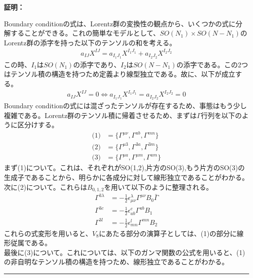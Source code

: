 \documentclass[dvipdfmx,a4paper,10.5pt]{article}
\numberwithin{equation}{section}
\newenvironment{proofbox}
{\begin{prooflabel}\textbf{証明：}\end{prooflabel}\vspace{0.8em}}
{\par\vspace{1em}\hrule\vspace{1em}}
\begin{document}
\begin{proofbox}
    Boundary conditionの式は、Lorentz群の変換性の観点から、いくつかの式に分解することができる。これの簡単なモデルとして、$SO(N_{1})\times SO(N-N_{1})$のLorentz群の添字を持った以下のテンソルの和を考える。
\begin{equation}\begin{split}
    a_{IJ}X^{IJ}=a_{I_{1}J_{1}}X^{I_{1}J_{1}}+a_{I_{2}J_{2}}X^{I_{2}J_{2}}
\end{split} \end{equation}
この時、$I_{1}$は$SO(N_{1})$の添字であり、$I_{2}$は$SO(N-N_{1})$の添字である。この2つはテンソル積の構造を持つため定義より線型独立である。故に、以下が成立する。
\begin{equation}\begin{split}
    a_{IJ}X^{IJ}=0\iff a_{I_{1}J_{1}}X^{I_{1}J_{1}}=a_{I_{2}J_{2}}X^{I_{2}J_{2}}=0
\end{split} \end{equation}
Boundary conditionの式には混ざったテンソルが存在するため、事態はもう少し複雑である。Lorentz群のテンソル積に帰着させるため、まずは$\Gamma$行列を以下のように区分けする。
\begin{equation}\begin{split}
    \text{(1)}&=\{\Gamma^{\mu\nu},\Gamma^{ab},\Gamma^{mn}\}\\
    \text{(2)}&=\{\Gamma^{\mu3},\Gamma^{3a},\Gamma^{3m}\}\\
    \text{(3)}&=\{\Gamma^{\mu a},\Gamma^{\mu m},\Gamma^{am}\}
\end{split} \end{equation}
まず(1)について。これは、それぞれがSO(1,2),片方のSO(3),もう片方のSO(3)の生成子であることから、明らかに各成分に対して線形独立であることがわかる。\\
次に(2)について。これらは$B_{0,1,2}$を用いて以下のように整理される。
\begin{equation}\begin{split}
    \Gamma^{3\lambda}&=-\frac{1}{2}\epsilon^{\lambda}_{\mu\nu}\Gamma^{\mu\nu}B_{0}\bar{\Gamma}\\
    \Gamma^{3c}&=-\frac{1}{2}\epsilon^{c}_{ab}\Gamma^{ab}B_{1}\\
     \Gamma^{3l}&=-\frac{1}{2}\epsilon^{l}_{mn}\Gamma^{mn}B_{2}
\end{split} \end{equation}
これらの式変形を用いると、$V_{8}$にあたる部分の演算子としては、(1)の部分に線形従属である。\\
最後に(3)について。これについては、以下のガンマ関数の公式を用いると、(1)の非自明なテンソル積の構造を持つため、線形独立であることがわかる。

\end{proofbox}
\end{document}
